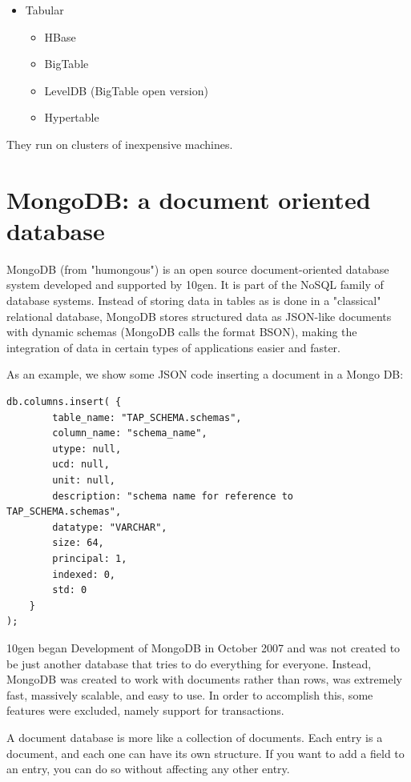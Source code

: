\begin{itemize}
\item Tabular

  \begin{itemize}
    \item HBase
    \item BigTable
    \item LevelDB (BigTable open version)
    \item Hypertable
  \end{itemize}
  

\end{itemize}

They run on clusters of inexpensive machines.



\section{MongoDB: a document oriented database}

MongoDB (from "humongous") is an open source document-oriented database system developed and supported by 10gen. It is part of the NoSQL family of database systems. Instead of storing data in tables as is done in a "classical" relational database, MongoDB stores structured data as JSON-like documents with dynamic schemas (MongoDB calls the format BSON), making the integration of data in certain types of applications easier and faster. \newline

As an example, we show some JSON code inserting a document in a Mongo DB:
\begin{lstlisting}
db.columns.insert( {
		table_name: "TAP_SCHEMA.schemas",
		column_name: "schema_name",
		utype: null,
		ucd: null,
		unit: null,
		description: "schema name for reference to TAP_SCHEMA.schemas",
		datatype: "VARCHAR",
		size: 64,
		principal: 1,
		indexed: 0,
		std: 0
	}
);
\end{lstlisting} 


10gen began Development of MongoDB in October 2007 and was not created to be just another database that tries to do everything for everyone. Instead, MongoDB was created to work with documents rather than rows, was extremely fast, massively scalable, and easy to use. In order to accomplish this, some features were excluded, namely support for transactions. \newline

A document database is more like a collection of documents. Each entry is a document, and each one can have its own structure. If you want to add a field to an entry, you can do so without affecting any other entry.

